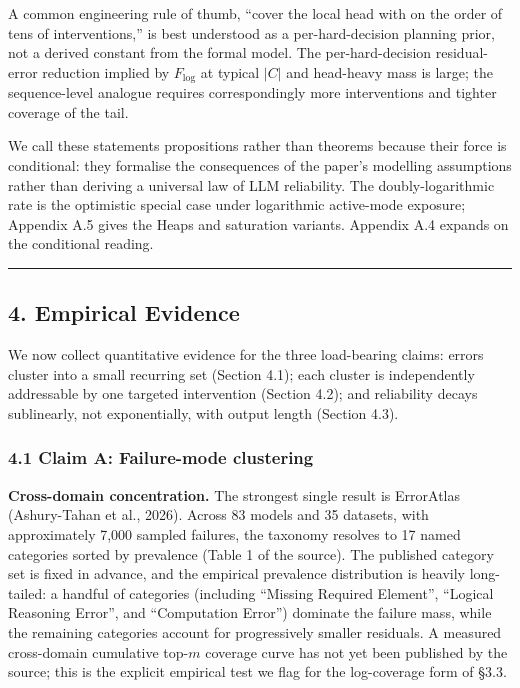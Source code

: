 \documentclass[
]{article}
\begin{document}
A common engineering rule of thumb, ``cover the local head with on the
order of tens of interventions,'' is best understood as a
per-hard-decision planning prior, not a derived constant from the formal
model. The per-hard-decision residual-error reduction implied by
\(F_{\log}\) at typical \(|C|\) and head-heavy mass is large; the
sequence-level analogue requires correspondingly more interventions and
tighter coverage of the tail.

We call these statements propositions rather than theorems because their
force is conditional: they formalise the consequences of the paper's
modelling assumptions rather than deriving a universal law of LLM
reliability. The doubly-logarithmic rate is the optimistic special case
under logarithmic active-mode exposure; Appendix A.5 gives the Heaps and
saturation variants. Appendix A.4 expands on the conditional reading.

\begin{center}\rule{0.5\linewidth}{0.5pt}\end{center}

\subsection{4. Empirical Evidence}\label{empirical-evidence}

We now collect quantitative evidence for the three load-bearing claims:
errors cluster into a small recurring set (Section 4.1); each cluster is
independently addressable by one targeted intervention (Section 4.2);
and reliability decays sublinearly, not exponentially, with output
length (Section 4.3).

\subsubsection{4.1 Claim A: Failure-mode
clustering}\label{claim-a-failure-mode-clustering}

\textbf{Cross-domain concentration.} The strongest single result is
ErrorAtlas (Ashury-Tahan et al., 2026). Across 83 models and 35
datasets, with approximately 7,000 sampled failures, the taxonomy
resolves to 17 named categories sorted by prevalence (Table 1 of the
source). The published category set is fixed in advance, and the
empirical prevalence distribution is heavily long-tailed: a handful of
categories (including ``Missing Required Element'', ``Logical Reasoning
Error'', and ``Computation Error'') dominate the failure mass, while the
remaining categories account for progressively smaller residuals. A
measured cross-domain cumulative top-\(m\) coverage curve has not yet
been published by the source; this is the explicit empirical test we
flag for the log-coverage form of §3.3.
\end{document}
